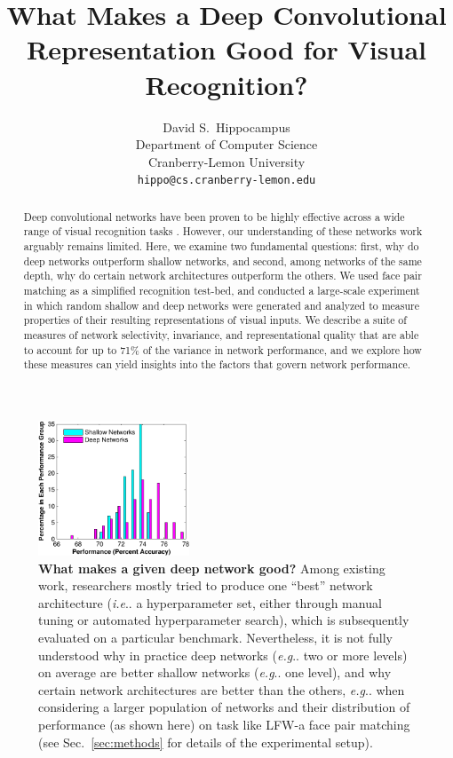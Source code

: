 \documentclass[fleqn]{article} %
\title{What Makes a Deep Convolutional Representation Good for Visual Recognition?} %
\author{
David S.~Hippocampus\\
Department of Computer Science\\
Cranberry-Lemon University\\
\texttt{hippo@cs.cranberry-lemon.edu} \\
}
\makeatletter
\DeclareRobustCommand\onedot{\futurelet\@let@token\@onedot}
\def\@onedot{\ifx\@let@token.\else.\null\fi\xspace}
\def\eg{\emph{e.g}\onedot} \def\Eg{\emph{E.g}\onedot}
\def\ie{\emph{i.e}\onedot} \def\Ie{\emph{I.e}\onedot}
\makeatother
\begin{document}
\maketitle

\begin{abstract}
Deep convolutional networks have been proven to be highly effective across a wide range of visual recognition tasks \cite{szegedy2014going, schroff2015facenet, donahue2014decaf}.
However, our understanding of these networks work arguably remains limited.
Here, we examine two fundamental questions: first, why do deep networks outperform shallow networks, and second, among networks of the same depth, why do certain network architectures outperform the others.
We used face pair matching as a simplified recognition test-bed, and conducted a large-scale experiment in which random shallow and deep networks were generated and analyzed to measure properties of their resulting representations of visual inputs.
We describe a suite of measures of network selectivity, invariance, and representational quality that are able to account for up to 71\% of the variance in network performance, and we explore how these measures can yield insights into the factors that govern network performance.  
\end{abstract}

\begin{figure} %
\centering \includegraphics[width=0.40\textwidth]{Figs/perf.pdf} %
\caption{{\bf What makes a given deep network good?}
Among existing work, researchers mostly tried to produce one ``best'' network architecture (\ie a hyperparameter set, either through manual tuning or automated hyperparameter search), which is subsequently evaluated on a particular benchmark.
Nevertheless, it is not fully understood why in practice deep networks (\eg two or more levels) on average are better shallow networks (\eg one level), and why certain network architectures are better than the others, \eg when considering a larger population of networks \cite{cox2011beyond} and their distribution of performance (as shown here) on task like LFW-a face pair matching \cite{wolf2011effective} (see Sec.~\ref{sec:methods} for details of the experimental setup). \vspace{-0.5ex}}
\label{fig:perf}
\end{figure}
\end{document}
